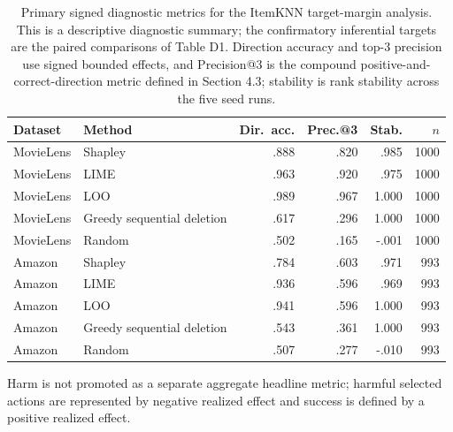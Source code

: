 \begin{table}[!htbp]
\centering\scriptsize
\setlength{\tabcolsep}{3pt}
\caption{Primary signed diagnostic metrics for the ItemKNN target-margin analysis. This is a descriptive diagnostic summary; the confirmatory inferential targets are the paired comparisons of Table D1. Direction accuracy and top-$3$ precision use signed bounded effects, and Precision@3 is the compound positive-and-correct-direction metric defined in Section 4.3; stability is rank stability across the five seed runs.}
\label{tab:app-diagnostics}
\begin{tabular}{@{}p{}p{}rrrr@{}}
\toprule
Dataset & Method & Dir.\ acc. & Prec.@3 & Stab. & $n$ \\
\midrule
MovieLens & Shapley & .888 & .820 & .985 & 1000 \\
MovieLens & LIME & .963 & .920 & .975 & 1000 \\
MovieLens & LOO & .989 & .967 & 1.000 & 1000 \\
MovieLens & Greedy sequential deletion & .617 & .296 & 1.000 & 1000 \\
MovieLens & Random & .502 & .165 & -.001 & 1000 \\
Amazon & Shapley & .784 & .603 & .971 & 993 \\
Amazon & LIME & .936 & .596 & .969 & 993 \\
Amazon & LOO & .941 & .596 & 1.000 & 993 \\
Amazon & Greedy sequential deletion & .543 & .361 & 1.000 & 993 \\
Amazon & Random & .507 & .277 & -.010 & 993 \\
\bottomrule
\end{tabular}
\end{table}

\noindent Harm is not promoted as a separate aggregate headline metric; harmful selected actions are represented by negative realized effect and success is defined by a positive realized effect.
